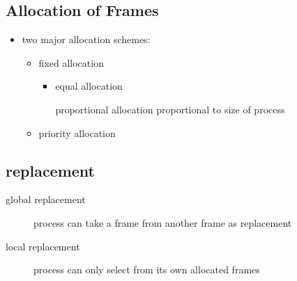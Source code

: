 \documentclass[11pt]{article}
\begin{document}
\subsection{Allocation of Frames}
\label{sec:org7d0883c}
\begin{itemize}
\item two major allocation schemes:
\begin{itemize}
\item fixed allocation
\begin{itemize}
\item equal allocation
\item[{proportional allocation}] proportional to size of process
\end{itemize}
\item priority allocation
\end{itemize}
\end{itemize}
\subsection{replacement}
\label{sec:orgfa8ee74}
\begin{description}
\item[{global replacement}] process can take a frame from another frame as replacement
\item[{local replacement}] process can only select from its own allocated frames
\end{description}
\end{document}
